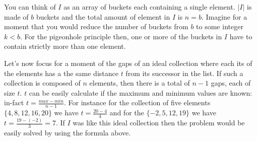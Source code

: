 You can think of $I$ as an array of buckets each containing a single element. $|I|$ is made of $b$
buckets and the total amount of element in $I$ is $n=b$. Imagine for a moment that you would reduce
the number of buckets from $b$ to some integer $k < b$. For the pigeonhole principle then, one or
more of the buckets in $I$ have to contain  strictly more than one element.

Let's now focus for a moment of the gaps of an ideal collection where each its of the elements has a
the same distance $t$ from its successor in the list. If such a collection is composed of  $n$
elements, then there is a total of $n-1$ gaps, each of size $t$. $t$ can be easily calculate if the
maximum and minimum values are known: in-fact $t=\frac{max-min}{n-1}$. For instance for the
collection of five elements $\{4,8,12,16,20\}$ we have $t=\frac{20-4}{4}$ and for the
$\{-2,5,12,19\}$ we have $t=\frac{19- (-2)}{3} = 7$. If $I$ was like this ideal collection then the
problem would be easily solved by using the formula above. 


